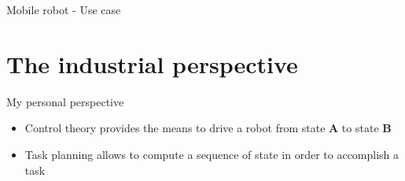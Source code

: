 \documentclass[usenames,dvipsnames,xcolor=table]{beamer}
\begin{document}
\begin{frame}{Mobile robot - Use case}
    \begin{center}
    \end{center}
\end{frame}


	


\section{The industrial perspective}


\begin{frame}{My personal perspective}

\begin{itemize}
    \item Control theory provides the means to drive a robot from state \textbf{A} to state \textbf{B}
    \item Task planning allows to compute a sequence of state in order to accomplish a task
\end{itemize}

\end{frame}

\end{document}
